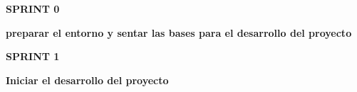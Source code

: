 \documentclass[a4paper]{article} %
\begin{document}
    \hfill
    \vfill
    \begin{center}
        \Huge \textbf{SPRINT 0 }\par\vspace{1cm}
        \huge \textbf{preparar el entorno y sentar las bases para el desarrollo del
        proyecto}
    \end{center}
    \vfill
    \hfill




\clearpage  %


\clearpage  %

\hfill
\vfill
\begin{center}
    \Huge \textbf{SPRINT 1 }\par\vspace{1cm}
    \huge \textbf{Iniciar el desarrollo del proyecto}
\end{center}
\vfill
\hfill


\clearpage  %

%
\end{document}
